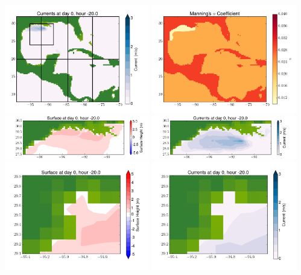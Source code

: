 \documentclass[11pt]{article}
\begin{document}
\includegraphics[width=0.475\textwidth]{frame0052fig2.png}
\vskip 10pt 
\includegraphics[width=0.475\textwidth]{frame0052fig3.png}
\includegraphics[width=0.475\textwidth]{frame0052fig4.png}
\vskip 10pt 
\includegraphics[width=0.475\textwidth]{frame0052fig5.png}
\includegraphics[width=0.475\textwidth]{frame0052fig6.png}
\vskip 10pt 
\includegraphics[width=0.475\textwidth]{frame0052fig7.png}
\end{document}
